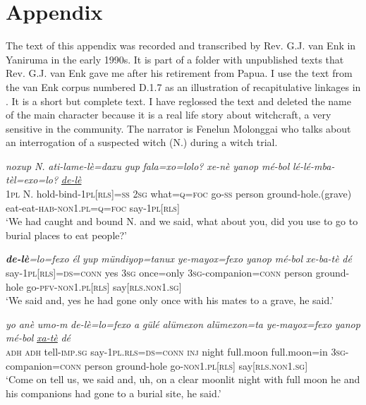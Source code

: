 \documentclass[output=paper]{LSP/langsci}
\begin{document}
\section*{Appendix}
 \setcounter{equation}{0}
The  text of this appendix was recorded and transcribed by Rev. G.J. van Enk in Yaniruma in the early 1990s. It is part of a folder with unpublished  texts that Rev. G.J. van Enk gave me after his retirement from Papua. I use the text from the van Enk corpus numbered D.1.7 as an illustration of recapitulative linkages in . It is a short but complete text. I have reglossed the text and deleted the name of the main character because it is a real life story about witchcraft, a very sensitive  in the  community. The narrator is Fenelun Molonggai who talks about an interrogation of a suspected witch (N.) during a witch trial.\\


\begin{exe}
 \label{Devex:App1}
\gll \textit{noxup} \textit{N.} \textit{ati-lame-lè=daxu} \textit{gup} \textit{fala=xo=lolo?} \textit{xe-nè} \textit{yanop} \textit{mé-bol} \textit{lé-lé-mba-tèl=exo=lo?} \underline{\textit{de-lè}}\\
\textsc{1pl}	N. hold-bind-\textsc{1pl[rls]=ss} \textsc{2sg} what=\textsc{q=foc}	go-\textsc{ss} person ground-hole.(grave) eat-eat-\textsc{hab-non1.pl=q=foc} say-\textsc{1pl[rls]}\\
\glt `We had caught and bound N. and  we said, what about you, did you use to go to burial places to eat people?'
\end{exe}

\begin{exe}
 \label{Devex:App2}
\gll \textit{\textbf{de-lè}=lo=fexo} \textit{él} \textit{yup} \textit{mündiyop=tanux} \textit{ye-mayox=fexo} \textit{yanop} \textit{mé-bol} \textit{xe-ba-tè} \textit{dé}\\
say-\textsc{1pl[rls]=ds=conn} yes \textsc{3sg} once=only \textsc{3sg}-companion=\textsc{conn} person ground-hole go-\textsc{pfv-non1.pl[rls]}			say[\textsc{rls.non1.sg}]\\
\glt `We said and, yes he had gone only once with his mates to a grave, he said.'
\end{exe}			
			

\begin{exe}
 \label{Devex:App3}			
\gll \textit{yo}	\textit{anè}	\textit{umo-m} \textit{de-lè=lo=fexo}	\textit{a} \textit{gülé} \textit{alümexon} \textit{alümexon=ta}	\textit{ye-mayox=fexo} \textit{yanop}	\textit{mé-bol} \underline{\textit{xa-tè}} \textit{dé}\\
\textsc{adh}	\textsc{adh}	tell-\textsc{imp.sg}	say-\textsc{1pl.rls=ds=conn}	\textsc{inj}	night full.moon full.moon=in \textsc{3sg}-companion=\textsc{conn}	person		ground-hole	go-\textsc{non1.pl[rls]}	say[\textsc{rls.non1.sg}]\\
\glt `Come on tell us, we said and, uh, on a clear moonlit night with full moon he and his companions had gone to a burial site, he said.'\\
\end{exe}			
\end{document}
